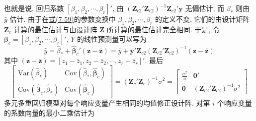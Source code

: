 也就是说, 回归系数 $[\beta_1,\beta_2,\cdots,\beta_r]'$, 由 $(\mathbf{Z}_{c2}'\mathbf{Z}_{c2})^{-1}\mathbf{Z}_{c2}'\mathbf{y}$ 无偏估计, 而 $\beta_*$ 则由 $\bar{y}$ 估计. 由于在\hyperref[eq:7-59]{式(7-59)}的参数变换中 $\beta_1,\beta_2,\cdots,\beta_r$ 的定义不变, 它们的由设计矩阵 $\mathbf{Z}_c$ 计算的最佳估计与由设计阵 $\mathbf{Z}$ 所计算的最佳估计完全相同. 于是, 令 $\boldsymbol{\beta}_c=[\beta_1,\beta_2,\cdots,\beta_r]'$, $Y$ 的线性预测量可以写为
\label{eq:7-61}
\begin{equation}
\hat{y}=\hat{\beta}_*+\hat{\boldsymbol{\beta}}_c'(\mathbf{z}-\bar{\mathbf{z}})=\bar{y}+\mathbf{y}'\mathbf{Z}_{c2}(\mathbf{Z}_{c2}'\mathbf{Z}_{c2})^{-1}(\mathbf{z}-\bar{\mathbf{z}}) \tag{7-61}
\end{equation}
其中 $(\mathbf{z}-\bar{\mathbf{z}})=[z_1-\bar{z}_1,z_2-\bar{z}_2,\cdots,z_r-\bar{z}_r]'$. 最后
\label{eq:7-62}
\begin{equation}
\begin{bmatrix}\mathrm{Var}(\hat{\beta}_*)&\mathrm{Cov}(\hat{\beta}_*,\hat{\boldsymbol{\beta}}_c)\\\mathrm{Cov}(\hat{\boldsymbol{\beta}}_c,\hat{\beta}_*)&\mathrm{Cov}(\hat{\boldsymbol{\beta}}_c)\end{bmatrix}=(\mathbf{Z}_c'\mathbf{Z}_c)^{-1}\sigma^2=\begin{bmatrix}\frac{\sigma^2}{n}&\mathbf{0}'\\\mathbf{0}&(\mathbf{Z}_{c2}'\mathbf{Z}_{c2})^{-1}\sigma^2\end{bmatrix} \tag{7-62}
\end{equation}
\quad 多元多重回归模型对每个响应变量产生相同的均值修正设计阵. 对第 $i$ 个响应变量的系数向量的最小二乘估计为
